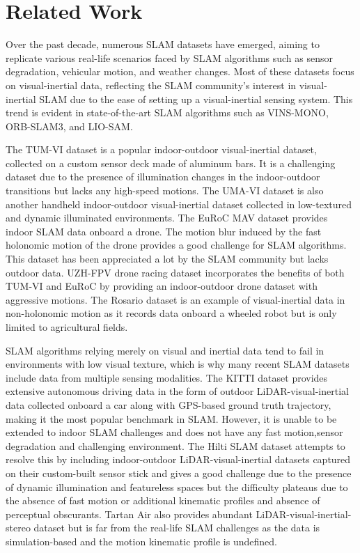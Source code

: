 \documentclass[10pt,twocolumn,letterpaper]{article}
\begin{document}
\section{Related Work} \label{sec:related_work}


Over the past decade, numerous SLAM datasets have emerged, aiming to replicate various real-life scenarios faced by SLAM algorithms such as sensor degradation, vehicular motion, and weather changes. Most of these datasets focus on visual-inertial data, reflecting the SLAM community's interest in visual-inertial SLAM due to the ease of setting up a visual-inertial sensing system. This trend is evident in state-of-the-art SLAM algorithms such as VINS-MONO, ORB-SLAM3, and LIO-SAM\cite{vins-mono, orb-slam3, liosam2020shan}.


The TUM-VI dataset\cite{schubert2018tum} is a popular indoor-outdoor visual-inertial dataset, collected on a custom sensor deck made of aluminum bars. It is a challenging dataset due to the presence of illumination changes in the indoor-outdoor transitions but lacks any high-speed motions. The UMA-VI dataset\cite{zuniga2020vi} is also another handheld indoor-outdoor visual-inertial dataset collected in low-textured and dynamic illuminated environments. The EuRoC MAV dataset\cite{Burri25012016} provides indoor SLAM data onboard a drone. The motion blur induced by the fast holonomic motion of the drone provides a good challenge for SLAM algorithms. This dataset has been appreciated a lot by the SLAM community but lacks outdoor data. UZH-FPV drone racing dataset\cite{Delmerico19icra} incorporates the benefits of both TUM-VI and EuRoC by providing an indoor-outdoor drone dataset with aggressive motions. The Rosario dataset\cite{rosario} is an example of visual-inertial data in non-holonomic motion as it records data onboard a wheeled robot but is only limited to agricultural fields.


SLAM algorithms relying merely on visual and inertial data tend to fail in environments with low visual texture, which is why many recent SLAM datasets include data from multiple sensing modalities. The KITTI dataset\cite{geiger2013vision} provides extensive autonomous driving data in the form of outdoor LiDAR-visual-inertial data collected onboard a car along with GPS-based ground truth trajectory, making it the most popular benchmark in SLAM. However, it is unable to be extended to indoor SLAM challenges and does not have any fast motion,sensor degradation and challenging environment. The Hilti SLAM dataset\cite{helmberger2022hilti} attempts to resolve this by including indoor-outdoor LiDAR-visual-inertial datasets captured on their custom-built sensor stick and gives a good challenge due to the presence of dynamic illumination and featureless spaces but the difficulty plateaus due to the absence of fast motion or additional kinematic profiles and absence of perceptual obscurants. Tartan Air\cite{tartanair2020iros} also provides abundant LiDAR-visual-inertial-stereo dataset but is far from the real-life SLAM challenges as the data is simulation-based and the motion kinematic profile is undefined.
\end{document}
